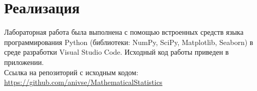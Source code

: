 \section{Реализация}

Лабораторная работа была выполнена с помощью встроенных средств языка программирования Python (библиотеки: NumPy, SciPy, Matplotlib, Seaborn) в среде разработки Visual Studio Code. Исходный код работы приведен в приложении.\\

Ссылка на репозиторий с исходным кодом: \url{https://github.com/anivse/MathematicalStatistics}

